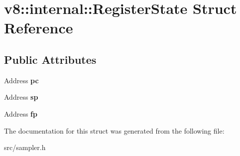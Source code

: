 \hypertarget{structv8_1_1internal_1_1_register_state}{}\section{v8\+:\+:internal\+:\+:Register\+State Struct Reference}
\label{structv8_1_1internal_1_1_register_state}
\subsection*{Public Attributes}
\begin{DoxyCompactItemize}
\item 
\hypertarget{structv8_1_1internal_1_1_register_state_af5ae6e9cdbdf44a9ae70f02dde258286}{}Address {\bfseries pc}\label{structv8_1_1internal_1_1_register_state_af5ae6e9cdbdf44a9ae70f02dde258286}

\item 
\hypertarget{structv8_1_1internal_1_1_register_state_ab8d8612568a449fbcd803c68da63ffee}{}Address {\bfseries sp}\label{structv8_1_1internal_1_1_register_state_ab8d8612568a449fbcd803c68da63ffee}

\item 
\hypertarget{structv8_1_1internal_1_1_register_state_a9b4a22eb3cd761c6aab6e78366efd28e}{}Address {\bfseries fp}\label{structv8_1_1internal_1_1_register_state_a9b4a22eb3cd761c6aab6e78366efd28e}

\end{DoxyCompactItemize}


The documentation for this struct was generated from the following file\+:\begin{DoxyCompactItemize}
\item 
src/sampler.\+h\end{DoxyCompactItemize}
